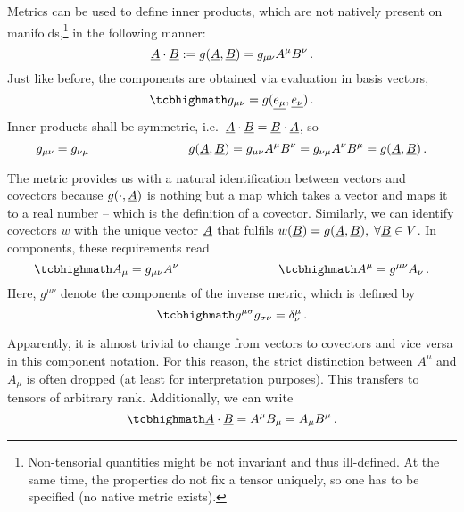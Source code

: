 \documentclass[../relativity_main.tex]{subfiles}
\begin{document}
Metrics can be used to define inner products, which are not natively present on manifolds,\footnote{Non-tensorial quantities might be not invariant and thus ill-defined. At the same time, the properties do not fix a tensor uniquely, so one has to be specified (no native metric exists).} in the following manner:
\begin{equation}
\underline{A} \cdot \underline{B} := g\qty(\underline{A}, \underline{B}) = g_{\mu \nu} A^\mu B^\nu \, .
\end{equation}
Just like before, the components are obtained via evaluation in basis vectors,
\begin{equation}
\eqbox{
g_{\mu \nu} = g(\fvec{e_\mu}, \fvec{e_\nu})
} \, .
\end{equation}
Inner products shall be symmetric, i.e.~$\underline{A} \cdot \underline{B} = \underline{B} \cdot \underline{A}$, so
\begin{equation}
g_{\mu \nu} = g_{\nu \mu}
\qquad \qquad \qquad \qquad
g\qty(\underline{A}, \underline{B}) = g_{\mu \nu} A^\mu B^\nu = g_{\nu \mu} A^\nu B^\mu = g\qty(\underline{A}, \underline{B})
 \, .
\end{equation}

The metric provides us with a natural identification %
between vectors and covectors because $g\qty(\cdot, \underline{A})$ is nothing but a map which takes a vector and maps it to a real number -- which is the definition of a covector. Similarly, we can identify covectors $w$ with the unique vector $\underline{A}$ that fulfils $w\qty(\underline{B}) = g\qty(\underline{A}, \underline{B}), \; \forall \underline{B} \in V$. In components, these requirements read
\begin{equation}
\eqbox{
A_\mu = g_{\mu \nu} A^\nu
}
\manyqquad
\eqbox{
A^\mu = g^{\mu \nu} A_\nu
} \, .
\end{equation}
Here, $g^{\mu \nu}$ denote the components of the inverse metric, which is defined by
\begin{equation}
\eqbox{
g^{\mu \sigma} g_{\sigma \nu} = \delta^\mu_\nu
} \, .
\end{equation}

Apparently, it is almost trivial to change from vectors to covectors and vice versa in this component notation. For this reason, the strict distinction between $A^\mu$ and $A_\mu$ is often dropped (at least for interpretation purposes). This transfers to tensors of arbitrary rank. Additionally, we can write
\begin{equation}
\eqbox{
\fvec{A} \cdot \fvec{B} = A^\mu B_\mu = A_\mu B^\mu
} \, .
\end{equation}
\end{document}
